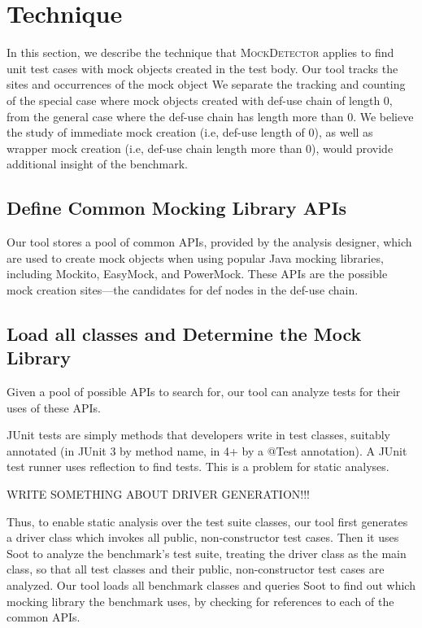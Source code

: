 \section{Technique}
\label{sec:technique}

In this section, we describe the technique that \textsc{MockDetector} applies to find unit test cases with mock objects created in the test body. Our tool tracks the sites and occurrences of the mock object  We separate the tracking and counting of the special case where mock objects created with def-use chain of length 0, from the general case where the def-use chain has length more than 0. We believe the study of immediate mock creation (i.e, def-use length of 0), as well as wrapper mock creation (i.e, def-use chain length more than 0), would provide additional insight of the benchmark. %

\subsection{Define Common Mocking Library APIs}
\label{subsec:collection}

Our tool stores a pool of common APIs, provided by the analysis designer, which are used to create mock objects when using popular Java mocking libraries, including Mockito, EasyMock, and PowerMock. These APIs are the possible mock creation sites---the candidates for def nodes in the def-use chain. %

\subsection{Load all classes and Determine the Mock Library}
\label{subsec:library}

Given a pool of possible APIs to search for, our tool can analyze tests for their uses of these APIs.%

JUnit tests are simply methods that developers write in test classes, suitably annotated (in JUnit 3 by method name, in 4+ by a @Test annotation). A JUnit test runner uses reflection to find tests. This is a problem for static analyses.

WRITE SOMETHING ABOUT DRIVER GENERATION!!!

Thus, to enable static analysis over the test suite classes, our tool first generates a driver class which invokes all public, non-constructor test cases. Then it uses Soot to analyze the benchmark's test suite, treating the driver class as the main class, so that all test classes and their public, non-constructor test cases are analyzed. Our tool loads all benchmark classes and queries Soot to find out which mocking library the benchmark uses, by checking for references to each of the common APIs.

